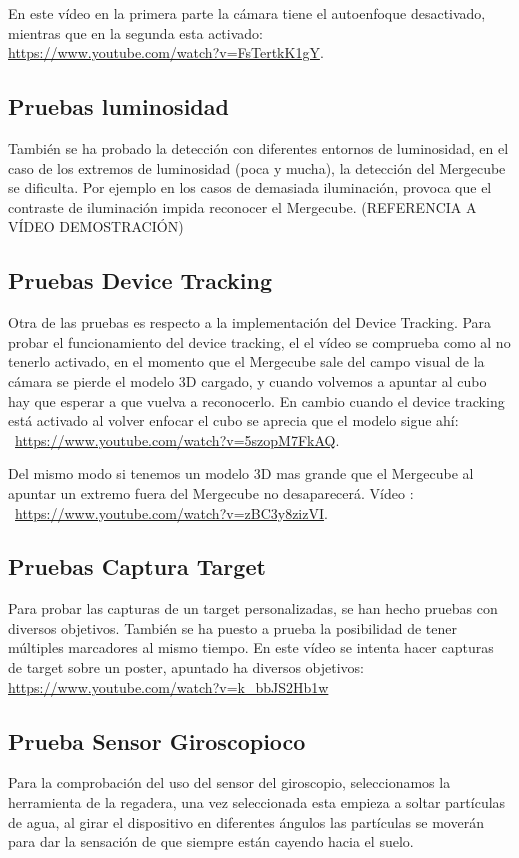 En este vídeo en la primera parte la cámara tiene el autoenfoque desactivado, mientras que en la segunda esta activado:\\ \url{https://www.youtube.com/watch?v=FsTertkK1gY}.



\subsection{Pruebas luminosidad}
También se ha probado la detección con diferentes entornos de luminosidad, en el caso de los extremos de luminosidad (poca y mucha), la detección del Mergecube se dificulta. Por ejemplo en los casos de demasiada iluminación, provoca que el contraste de iluminación impida reconocer el Mergecube. 
(REFERENCIA A VÍDEO DEMOSTRACIÓN)

\subsection{Pruebas Device Tracking}
Otra de las pruebas es respecto a la implementación del Device Tracking. Para probar el funcionamiento del device tracking, el el vídeo se comprueba como al no tenerlo activado, en el momento que el Mergecube sale del campo visual de la cámara se pierde el modelo 3D cargado, y cuando volvemos a apuntar al cubo hay que esperar a que vuelva a reconocerlo. En cambio cuando el device tracking está activado al volver enfocar el cubo se aprecia que el modelo sigue ahí:\\~\url{https://www.youtube.com/watch?v=5szopM7FkAQ}.

Del mismo modo si tenemos un modelo 3D mas grande que el Mergecube al apuntar un extremo fuera del Mergecube no desaparecerá. Vídeo :\\~\url{https://www.youtube.com/watch?v=zBC3y8zizVI}.

\subsection{Pruebas Captura Target}
Para probar las capturas de un target personalizadas, se han hecho pruebas con diversos objetivos. También se ha puesto a prueba la posibilidad de tener múltiples marcadores al mismo tiempo. En este vídeo se intenta hacer capturas de target sobre un poster, apuntado ha diversos objetivos: \url{https://www.youtube.com/watch?v=k_bbJS2Hb1w}	


\subsection{Prueba Sensor Giroscopioco}
Para la comprobación del uso del sensor del giroscopio, seleccionamos la herramienta de la regadera, una vez seleccionada esta empieza a soltar partículas de agua, al girar el dispositivo en diferentes ángulos las partículas se moverán para dar la sensación de que siempre están cayendo hacia el suelo. 

